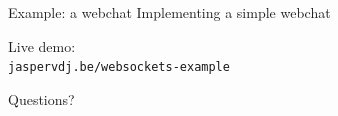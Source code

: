 \documentclass[20pt]{beamer}
\newcommand{\vspaced}{
    \vspace{5mm}
}
\begin{document}
\begin{frame}[fragile]{Example: a webchat}
    Implementing a simple webchat \\
    \vspaced
    Live demo: \\
    \small{\verb#jaspervdj.be/websockets-example#}
\end{frame}


\begin{frame}[plain]
    \begin{center}
    \huge{Questions?}
    \end{center}
\end{frame}

\end{document}
